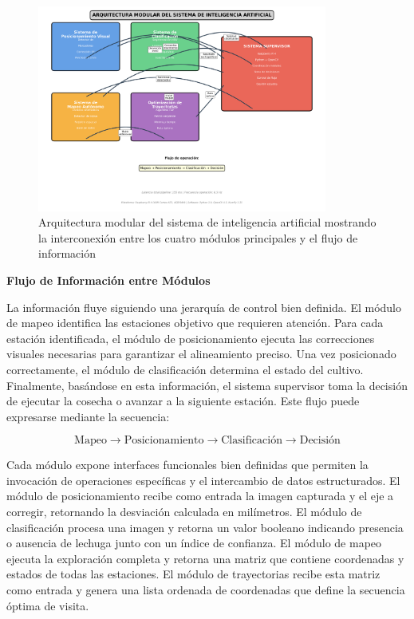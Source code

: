 \begin{figure}[h]
\centering
\includegraphics[width=0.85\textwidth]{imagenes/arquitectura_modular_ia.png}
\caption{Arquitectura modular del sistema de inteligencia artificial mostrando la interconexión entre los cuatro módulos principales y el flujo de información}
\label{fig:arquitectura_modular}
\end{figure}

\textbf{Flujo de Información entre Módulos}

La información fluye siguiendo una jerarquía de control bien definida. El módulo de mapeo identifica las estaciones objetivo que requieren atención. Para cada estación identificada, el módulo de posicionamiento ejecuta las correcciones visuales necesarias para garantizar el alineamiento preciso. Una vez posicionado correctamente, el módulo de clasificación determina el estado del cultivo. Finalmente, basándose en esta información, el sistema supervisor toma la decisión de ejecutar la cosecha o avanzar a la siguiente estación. Este flujo puede expresarse mediante la secuencia:

\begin{equation}
\text{Mapeo} \rightarrow \text{Posicionamiento} \rightarrow \text{Clasificación} \rightarrow \text{Decisión}
\end{equation}

Cada módulo expone interfaces funcionales bien definidas que permiten la invocación de operaciones específicas y el intercambio de datos estructurados. El módulo de posicionamiento recibe como entrada la imagen capturada y el eje a corregir, retornando la desviación calculada en milímetros. El módulo de clasificación procesa una imagen y retorna un valor booleano indicando presencia o ausencia de lechuga junto con un índice de confianza. El módulo de mapeo ejecuta la exploración completa y retorna una matriz que contiene coordenadas y estados de todas las estaciones. El módulo de trayectorias recibe esta matriz como entrada y genera una lista ordenada de coordenadas que define la secuencia óptima de visita.

